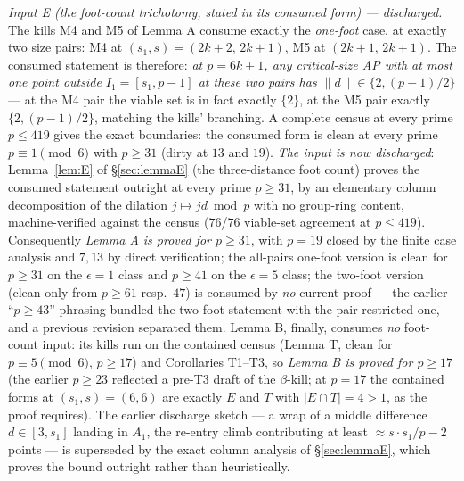 \documentclass[11pt,a4paper]{article}
\numberwithin{equation}{section}
\theoremstyle{plain}
\theoremstyle{plain}
\theoremstyle{definition}
\theoremstyle{remark}
\begin{document}
\emph{Input E (the foot-count trichotomy, stated in its consumed form) ---
discharged.}
The kills M4 and M5 of Lemma A consume exactly the \emph{one-foot} case, at
exactly two size pairs: M4 at $(s_1,s)=(2k{+}2,\,2k{+}1)$, M5 at
$(2k{+}1,\,2k{+}1)$. The consumed statement is therefore: \emph{at
$p=6k+1$, any critical-size AP with at most one point outside
$I_1=[s_1,p-1]$ at these two pairs has $\|d\|\in\{2,(p{-}1)/2\}$} --- at
the M4 pair the viable set is in fact exactly $\{2\}$, at the M5 pair
exactly $\{2,(p{-}1)/2\}$, matching the kills' branching. A complete
census at every prime $p\le419$ gives the exact boundaries: the consumed
form is clean at every prime $p\equiv1\pmod6$ with $p\ge31$ (dirty at $13$
and $19$). \emph{The input is now discharged}: Lemma~\ref{lem:E} of
\S\ref{sec:lemmaE} (the three-distance foot count) proves the consumed
statement outright at every prime $p\ge31$, by an elementary column
decomposition of the dilation $j\mapsto jd\bmod p$ with no group-ring
content, machine-verified against the census ($76$/$76$ viable-set
agreement at $p\le419$). Consequently \emph{Lemma A is proved for
$p\ge31$}, with $p=19$ closed by the finite case analysis and $7,13$ by
direct verification; the all-pairs one-foot version is clean for $p\ge31$
on the $\epsilon=1$ class and $p\ge41$ on the $\epsilon=5$ class; the two-foot
version (clean only from $p\ge61$ resp.\ $47$) is consumed by \emph{no}
current proof --- the earlier ``$p\ge43$'' phrasing bundled the two-foot
statement with the pair-restricted one, and a previous revision separated
them. Lemma B, finally, consumes \emph{no} foot-count input: its kills run
on the contained census (Lemma T, clean for $p\equiv5\pmod6$, $p\ge17$) and
Corollaries T1--T3, so \emph{Lemma B is proved for $p\ge17$} (the earlier
$p\ge23$ reflected a pre-T3 draft of the $\beta$-kill; at $p=17$ the
contained forms at $(s_1,s)=(6,6)$ are exactly $E$ and $T$ with
$|E\cap T|=4>1$, as the proof requires). The earlier discharge sketch ---
a wrap of a middle difference $d\in[3,s_1]$ landing in $A_1$, the
re-entry climb contributing at least $\approx s\cdot s_1/p-2$ points ---
is superseded by the exact column analysis of \S\ref{sec:lemmaE}, which
proves the bound outright rather than heuristically.
\end{document}

